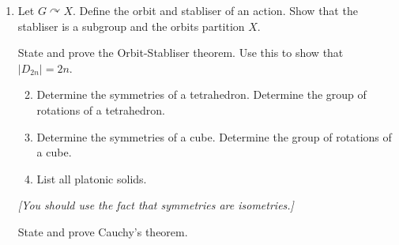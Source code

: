 \documentclass[11pt]{article}
\newlength{\qspace}
\newcounter{qnumber}
\newenvironment{question}%
 {\vspace{\qspace}
  \begin{enumerate}[\bfseries 1\quad][10]%
    \setcounter{enumi}{\value{qnumber}}%
    \item%
 }
{
  \end{enumerate}
  \filbreak
  \stepcounter{qnumber}
 }
\newenvironment{questionparts}[1][1]%
 {
  \begin{enumerate}[\bfseries (i)]%
    \setcounter{enumii}{#1}
    \addtocounter{enumii}{-1}
    \setlength{\parskip}{3pt}
 }
 {
  \end{enumerate}
 }
\begin{document}
\begin{question}
  Let $ G \curvearrowright X $. Define the orbit and stabliser of an action. Show that the stabliser is a subgroup and the orbits partition $X$.

  State and prove the Orbit-Stabliser theorem. Use this to show that $ |D_{2n}|=2n $.

  \begin{questionparts}
    \item Determine the symmetries of a tetrahedron. Determine the group of rotations of a tetrahedron.
    \item Determine the symmetries of a cube. Determine the group of rotations of a cube.
    \item List all platonic solids.
  \end{questionparts}
  \textit{[You should use the fact that symmetries are isometries.]}

  State and prove Cauchy's theorem.
\end{question}
\end{document}
